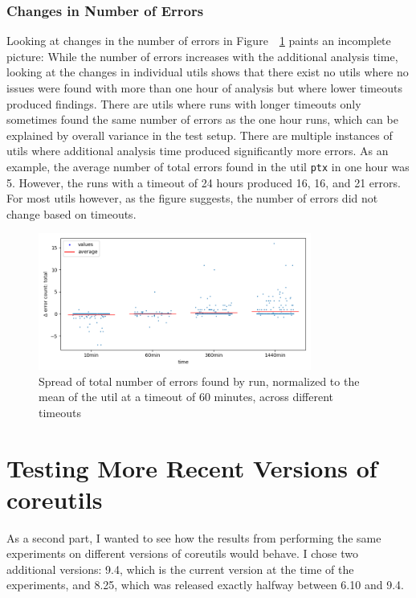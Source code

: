 \documentclass{article}
\let\savedRef=\ref
\renewcommand{\ref}{\unskip~\savedRef}
\begin{document}
\subsubsection{Changes in Number of Errors}

Looking at changes in the number of errors in Figure~\ref{fig:spread_across_times_errors} paints an incomplete picture: While the number of errors increases with the additional analysis time, looking at the changes in individual utils shows that there exist no utils where no issues were found with more than one hour of analysis but where lower timeouts produced findings. There are utils where runs with longer timeouts only sometimes found the same number of errors as the one hour runs, which can be explained by overall variance in the test setup. There are multiple instances of utils where additional analysis time produced significantly more errors. As an example, the average number of total errors found in the util \lstinline{ptx} in one hour was 5. However, the runs with a timeout of 24 hours produced 16, 16, and 21 errors. For most utils however, as the figure suggests, the number of errors did not change based on timeouts.

\begin{figure}[ht]
    \centering
    \includegraphics[width=0.8\textwidth]{../plots/num_errors (total)/changes-by-time.png}
    \captionsetup{width=0.6\textwidth}
    \caption{Spread of total number of errors found by run, normalized to the mean of the util at a timeout of 60 minutes, across different timeouts}
    \label{fig:spread_across_times_errors}
\end{figure}

\section{Testing More Recent Versions of coreutils}
\label{SoftwareEvolution}

As a second part, I wanted to see how the results from performing the same experiments on different versions of coreutils would behave. I chose two additional versions: 9.4, which is the current version at the time of the experiments, and 8.25, which was released exactly halfway between 6.10 and 9.4.
\end{document}
